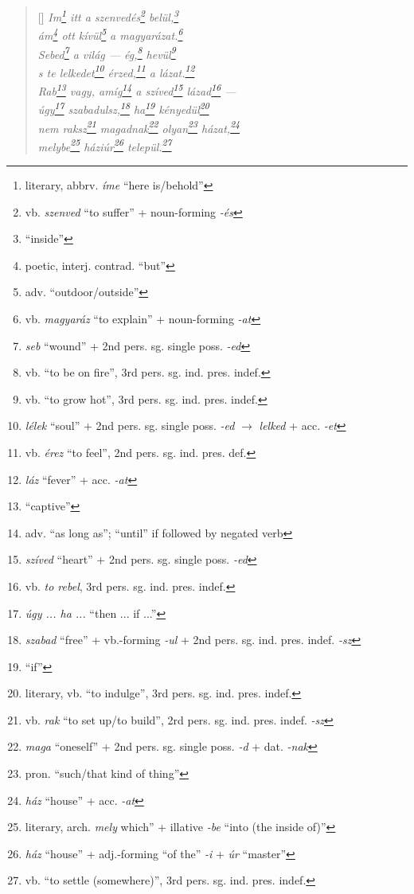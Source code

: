 \documentclass[a4paper,12pt,twoside,final]{book}
\begin{document}
\begin{verse}[\versewidth]
  \it
  Im\footnote{literary, abbrv. \emph{íme} ``here is/behold''}
  itt a szenvedés\footnote{vb. \emph{szenved} ``to suffer''
  + noun-forming \emph{-és}} belül,\footnote{``inside''} \\
  ám\footnote{poetic, interj. contrad. ``but''} ott
  kívül\footnote{adv. ``outdoor/outside''} a
  magyarázat.\footnote{vb. \emph{magyaráz} ``to explain'' +
  noun-forming \emph{-at}} \\
  Sebed\footnote{\emph{seb} ``wound'' + 2nd
  pers. sg. single poss. \emph{-ed}} a világ --- ég,\footnote{vb.
  ``to be on fire'', 3rd pers. sg. ind. pres. indef.}
  hevül\footnote{vb. ``to grow hot'', 3rd
  pers. sg. ind. pres. indef.} \\
  s te lelkedet\footnote{\emph{lélek} ``soul'' + 2nd
  pers. sg. single poss. \emph{-ed} $\rightarrow$ \emph{lelked} +
  acc. \emph{-et}} érzed,\footnote{vb. \emph{érez} ``to feel'', 2nd
  pers. sg. ind. pres. def.} a lázat.\footnote{\emph{láz} ``fever'' +
  acc. \emph{-at}} \\
  Rab\footnote{``captive''} vagy, amíg\footnote{adv. ``as long as'';
  ``until'' if followed by negated verb} a
  szíved\footnote{\emph{szíved} ``heart'' + 2nd pers. sg. single
  poss. \emph{-ed}} lázad\footnote{vb. \emph{to rebel}, 3rd
  pers. sg. ind. pres. indef.} --- \\
  úgy\footnote{\emph{úgy ... ha ...} ``then ... if ...''}
  szabadulsz,\footnote{\emph{szabad} ``free'' + vb.-forming \emph{-ul}
  + 2nd pers. sg. ind. pres. indef. \emph{-sz}} ha\footnote{``if''}
  kényedül\footnote{literary, vb. ``to indulge'', 3rd
  pers. sg. ind. pres. indef.} \\
  nem raksz\footnote{vb. \emph{rak} ``to set up/to build'', 2rd
  pers. sg. ind. pres. indef. \emph{-sz}}
  magadnak\footnote{\emph{maga} ``oneself'' + 2nd pers. sg. single
  poss. \emph{-d} + dat. \emph{-nak}}
  olyan\footnote{pron. ``such/that kind of thing''}
  házat,\footnote{\emph{ház} ``house'' + acc. \emph{-at}} \\
  melybe\footnote{literary, arch. \emph{mely}
   which'' + illative \emph{-be} ``into (the inside of)''}
  háziúr\footnote{\emph{ház} ``house'' + adj.-forming ``of the''
  \emph{-i} + \emph{úr} ``master''} települ.\footnote{vb. ``to
  settle (somewhere)'', 3rd pers. sg. ind. pres. indef.}
\end{verse}

\newpage

\end{document}
